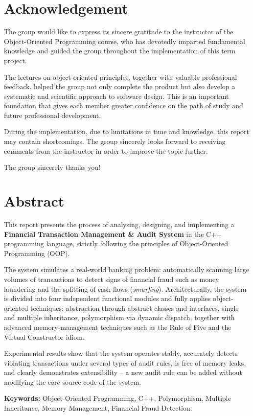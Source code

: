 \chapter*{Acknowledgement}
The group would like to express its sincere gratitude to the instructor of the Object-Oriented Programming course, who has devotedly imparted fundamental knowledge and guided the group throughout the implementation of this term project.

The lectures on object-oriented principles, together with valuable professional feedback, helped the group not only complete the product but also develop a systematic and scientific approach to software design. This is an important foundation that gives each member greater confidence on the path of study and future professional development.

During the implementation, due to limitations in time and knowledge, this report may contain shortcomings. The group sincerely looks forward to receiving comments from the instructor in order to improve the topic further.

The group sincerely thanks you!

\chapter*{Abstract}
This report presents the process of analysing, designing, and implementing a \textbf{Financial Transaction Management \& Audit System} in the C++ programming language, strictly following the principles of Object-Oriented Programming (OOP).

The system simulates a real-world banking problem: automatically scanning large volumes of transactions to detect signs of financial fraud such as money laundering and the splitting of cash flows (\textit{smurfing}). Architecturally, the system is divided into four independent functional modules and fully applies object-oriented techniques: abstraction through abstract classes and interfaces, single and multiple inheritance, polymorphism via dynamic dispatch, together with advanced memory-management techniques such as the Rule of Five and the Virtual Constructor idiom.

Experimental results show that the system operates stably, accurately detects violating transactions under several types of audit rules, is free of memory leaks, and clearly demonstrates extensibility -- a new audit rule can be added without modifying the core source code of the system.

\textbf{Keywords:} Object-Oriented Programming, C++, Polymorphism, Multiple Inheritance, Memory Management, Financial Fraud Detection.
